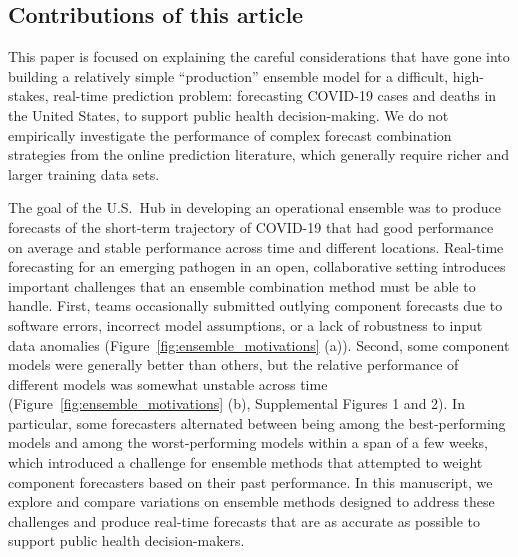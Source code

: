 \documentclass[11pt,3p,review,authoryear]{elsarticle}
\begin{document}
\subsection{Contributions of this article}


This paper is focused on explaining the careful considerations that have gone into building a relatively simple ``production'' ensemble model for a difficult, high-stakes, real-time prediction problem: forecasting COVID-19 cases and deaths in the United States, to support public health decision-making.
We do not empirically investigate the performance of complex forecast combination strategies from the online prediction literature, which generally require richer and larger training data sets.

The goal of the U.S.\ Hub in developing an operational ensemble was to produce forecasts of the short-term trajectory of COVID-19 that had good performance on average and stable performance across time and different locations.
Real-time forecasting for an emerging pathogen in an open, collaborative setting introduces important challenges that an ensemble combination method must be able to handle.
First, teams occasionally submitted outlying component forecasts due to software errors, incorrect model assumptions, or a lack of robustness to input data anomalies (Figure~\ref{fig:ensemble_motivations} (a)).
Second, some component models were generally better than others, but the relative performance of different models was somewhat unstable across time (Figure~\ref{fig:ensemble_motivations} (b), Supplemental Figures 1 and 2).
In particular, some forecasters alternated between being among the best-performing models and among the worst-performing models within a span of a few weeks, which introduced a challenge for ensemble methods that attempted to weight component forecasters based on their past performance.
In this manuscript, we explore and compare variations on ensemble methods designed to address these challenges and produce real-time forecasts that are as accurate as possible to support public health decision-makers.
\end{document}
